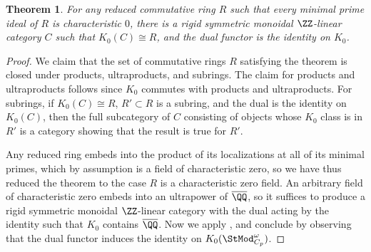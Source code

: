 \documentclass[12pt,oneside]{article}
\newcounter{counter}
\newtheorem{thm}[counter]{Theorem}
\begin{document}
\begin{thm}\label{cor:subring}
	For any reduced commutative ring $R$ such that every minimal prime ideal of $R$ is characteristic $0$, there is a rigid symmetric monoidal $\ZZ$-linear category $C$ such that $K_0(C) \cong R$, and the dual functor is the identity on $K_0$.
\end{thm}
\begin{proof}
	We claim that the set of commutative rings $R$ satisfying the theorem is closed under products, ultraproducts, and subrings. The claim for products and ultraproducts follows since $K_0$ commutes with products and ultraproducts. For subrings, if $K_0(C) \cong R$, $R' \subset R$ is a subring, and the dual is the identity on $K_0(C)$, then the full subcategory of $C$ consisting of objects whose $K_0$ class is in $R'$ is a category showing that the result is true for $R'$.
	
	Any reduced ring embeds into the product of its localizations at all of its minimal primes, which by assumption is a field of characteristic zero, so we have thus reduced the theorem to the case $R$ is a characteristic zero field. An arbitrary field of characteristic zero embeds into an ultrapower of $\overline{\QQ}$, so it suffices to produce a rigid symmetric monoidal $\ZZ$-linear category with the dual acting by the identity such that $K_0$ contains $\overline{\QQ}$. Now we apply , and conclude by observing that the dual functor induces the identity on $K_0(\StMod^{\omega}_{C_p})$.
	
%	
\end{proof}
\end{document}
